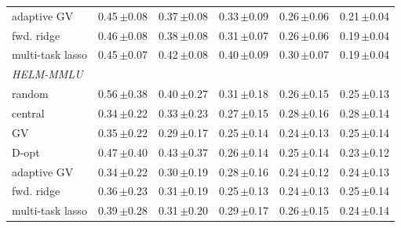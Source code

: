 \begin{tabular}{lrrrrr}
adaptive GV & 0.45\,{\scriptsize$\pm$0.08} & 0.37\,{\scriptsize$\pm$0.08} & 0.33\,{\scriptsize$\pm$0.09} & 0.26\,{\scriptsize$\pm$0.06} & 0.21\,{\scriptsize$\pm$0.04} \\
fwd. ridge & 0.46\,{\scriptsize$\pm$0.08} & 0.38\,{\scriptsize$\pm$0.08} & 0.31\,{\scriptsize$\pm$0.07} & 0.26\,{\scriptsize$\pm$0.06} & 0.19\,{\scriptsize$\pm$0.04} \\
multi-task lasso & 0.45\,{\scriptsize$\pm$0.07} & 0.42\,{\scriptsize$\pm$0.08} & 0.40\,{\scriptsize$\pm$0.09} & 0.30\,{\scriptsize$\pm$0.07} & 0.19\,{\scriptsize$\pm$0.04} \\
\midrule
\multicolumn{6}{l}{\emph{HELM-MMLU}} \\
random & 0.56\,{\scriptsize$\pm$0.38} & 0.40\,{\scriptsize$\pm$0.27} & 0.31\,{\scriptsize$\pm$0.18} & 0.26\,{\scriptsize$\pm$0.15} & 0.25\,{\scriptsize$\pm$0.13} \\
central & 0.34\,{\scriptsize$\pm$0.22} & 0.33\,{\scriptsize$\pm$0.23} & 0.27\,{\scriptsize$\pm$0.15} & 0.28\,{\scriptsize$\pm$0.16} & 0.28\,{\scriptsize$\pm$0.14} \\
GV & 0.35\,{\scriptsize$\pm$0.22} & 0.29\,{\scriptsize$\pm$0.17} & 0.25\,{\scriptsize$\pm$0.14} & 0.24\,{\scriptsize$\pm$0.13} & 0.25\,{\scriptsize$\pm$0.14} \\
D-opt & 0.47\,{\scriptsize$\pm$0.40} & 0.43\,{\scriptsize$\pm$0.37} & 0.26\,{\scriptsize$\pm$0.14} & 0.25\,{\scriptsize$\pm$0.14} & 0.23\,{\scriptsize$\pm$0.12} \\
adaptive GV & 0.34\,{\scriptsize$\pm$0.22} & 0.30\,{\scriptsize$\pm$0.19} & 0.28\,{\scriptsize$\pm$0.16} & 0.24\,{\scriptsize$\pm$0.12} & 0.24\,{\scriptsize$\pm$0.13} \\
fwd. ridge & 0.36\,{\scriptsize$\pm$0.23} & 0.31\,{\scriptsize$\pm$0.19} & 0.25\,{\scriptsize$\pm$0.13} & 0.24\,{\scriptsize$\pm$0.13} & 0.25\,{\scriptsize$\pm$0.14} \\
multi-task lasso & 0.39\,{\scriptsize$\pm$0.28} & 0.31\,{\scriptsize$\pm$0.20} & 0.29\,{\scriptsize$\pm$0.17} & 0.26\,{\scriptsize$\pm$0.15} & 0.24\,{\scriptsize$\pm$0.14} \\
\bottomrule
\end{tabular}
